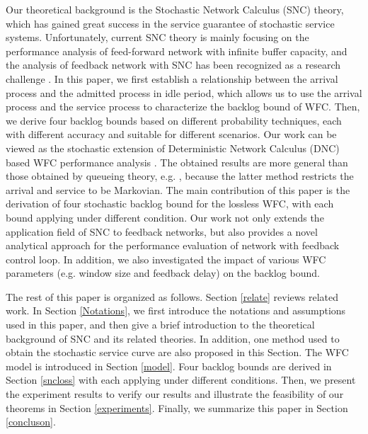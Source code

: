 \documentclass[12pt]{article}
\begin{document}
Our theoretical background is the Stochastic Network Calculus (SNC) \cite{Chan94,jiang2006basic,Ciucu2006Scaling,5984844,Fidl06} theory, which has gained great success in the service guarantee of stochastic service systems. Unfortunately, current SNC theory is mainly focusing on the performance analysis of feed-forward network with infinite buffer capacity, and the analysis of feedback network with SNC has been recognized as a research challenge \cite{JiangLiu-15877}. In this paper, we first establish a relationship between the arrival process and the admitted process in idle period, which allows us to use the arrival process and the service process to characterize the backlog bound of WFC. Then, we derive four backlog bounds based on different probability techniques, each with different accuracy and suitable for different scenarios. Our work can be viewed as the stochastic extension of Deterministic Network Calculus (DNC) based WFC performance analysis \cite{CrOk96,AgRa96,Chan98,ACOR99,QLDD09FC,bose2006analysis,Qian2010Analysis}. The obtained results are more general than those obtained by queueing theory, e.g. \cite{1095377,jung1996analysis}, because the latter method restricts the arrival and service to be Markovian. The main contribution of this paper is the derivation of four stochastic backlog bound for the lossless WFC, with each bound applying under different condition. Our work not only extends the application field of SNC to feedback networks, but also provides a novel analytical approach for the performance evaluation of network with feedback control loop. In addition, we also investigated the impact of various WFC parameters (e.g. window size and feedback delay) on the backlog bound.

The rest of this paper is organized as follows. Section \ref{relate} reviews related work. In Section \ref{Notations}, we first introduce the notations and assumptions used in this paper, and then give a brief introduction to the theoretical background of SNC and its related theories. In addition, one method used to obtain the stochastic service curve are also proposed in this Section. The WFC model is introduced in Section \ref{model}. Four backlog bounds are derived in Section \ref{sncloss} with each applying under different conditions. Then, we present the experiment results to verify our results and illustrate the feasibility of our theorems in Section \ref{experiments}. Finally, we summarize this paper in Section \ref{concluson}.
\end{document}
